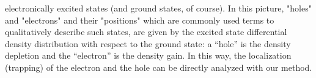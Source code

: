 \documentclass[a4paper,11pt,headings=normal]{scrartcl}
\begin{document}
electronically excited states (and ground states, of course). In this picture, 
"holes" and "electrons" and their "positions" which are commonly used terms to 
qualitatively describe such states, are given by the excited state differential 
density distribution with respect to the ground state: a ``hole'' is the density 
depletion and the ``electron'' is the density gain. In this way, the localization 
(trapping) of the electron and the hole can be directly analyzed with our method.\\
\end{document}
